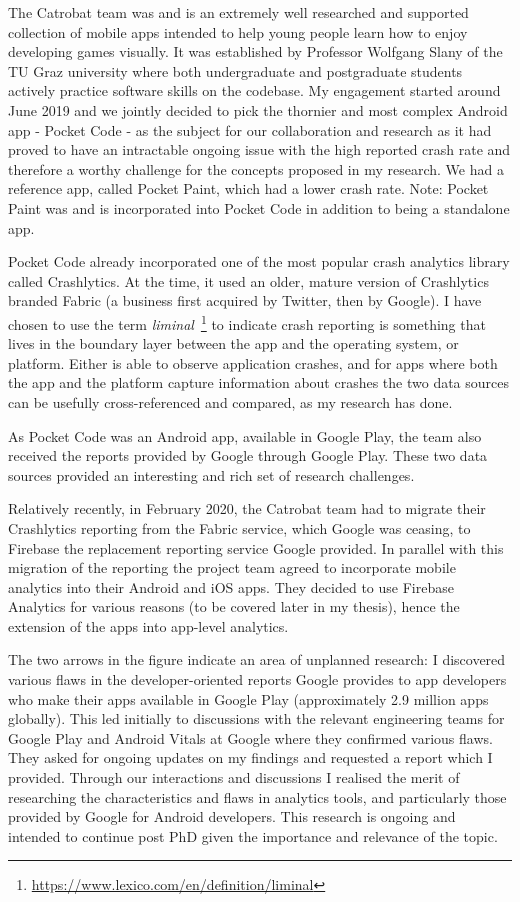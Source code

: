 The Catrobat team was and is an extremely well researched and supported collection of mobile apps intended to help young people learn how to enjoy developing games visually. It was established by Professor Wolfgang Slany of the TU Graz university where both undergraduate and postgraduate students actively practice software skills on the codebase. My engagement started around June 2019 and we jointly decided to pick the thornier and most complex Android app - Pocket Code - as the subject for our collaboration and research as it had proved to have an intractable ongoing issue with the high reported crash rate and therefore a worthy challenge for the concepts proposed in my research. We had a reference app, called Pocket Paint, which had a lower crash rate. Note: Pocket Paint was and is incorporated into Pocket Code in addition to being a standalone app.

Pocket Code already incorporated one of the most popular crash analytics library called Crashlytics. At the time, it used an older, mature version of Crashlytics branded Fabric (a business first acquired by Twitter, then by Google). I have chosen to use the term \emph{liminal}~\footnote{\url{https://www.lexico.com/en/definition/liminal}} to indicate crash reporting is something that lives in the boundary layer between the app and the operating system, or platform. Either is able to observe application crashes, and for apps where both the app and the platform capture information about crashes the two data sources can be usefully cross-referenced and compared, as my research has done.

As Pocket Code was an Android app, available in Google Play, the team also received the reports provided by Google through Google Play. These two data sources provided an interesting and rich set of research challenges. 

Relatively recently, in February 2020, the Catrobat team had to migrate their Crashlytics reporting from the Fabric service, which Google was ceasing, to Firebase the replacement reporting service Google provided. In parallel with this migration of the reporting the project team agreed to incorporate mobile analytics into their Android and iOS apps. They decided to use Firebase Analytics for various reasons (to be covered later in my thesis), hence the extension of the apps into app-level analytics.

The two arrows in the figure indicate an area of unplanned research: 
%
I discovered various flaws in the developer-oriented reports Google provides to app developers who make their apps available in Google Play (approximately 2.9 million apps globally). This led initially to discussions with the relevant engineering teams for Google Play and Android Vitals at Google where they confirmed various flaws. They asked for ongoing updates on my findings and requested a report which I provided. Through our interactions and discussions I realised the merit of researching the characteristics and flaws in analytics tools, and particularly those provided by Google for Android developers. This research is ongoing and intended to continue post PhD given the importance and relevance of the topic.

